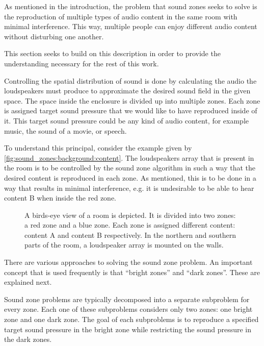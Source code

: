 As mentioned in the introduction, the problem that sound zones seeks to solve is the reproduction
of multiple types of audio content in the same room with minimal interference.
This way, multiple people can enjoy different audio content without disturbing one another.

This section seeks to build on this description in order to provide the understanding necessary 
for the rest of this work.

Controlling the spatial distribution of sound is done by calculating the audio the loudspeakers must produce to approximate 
the desired sound field in the given space.
The space inside the enclosure is divided up into multiple zones.
Each zone is assigned target sound pressure that we would like to have reproduced inside of it.
This target sound pressure could be any kind of audio content, for example music, the sound of a movie, or speech.

To understand this principal, consider the example given by \autoref{fig:sound_zones:background:content}.
The loudspeakers array that is present in the room is to be controlled by the sound zone algorithm 
in such a way that the desired content is reproduced in each zone.
As mentioned, this is to be done in a way that results in minimal interference, e.g. it is undesirable
to be able to hear content B when inside the red zone.

\begin{figure}[h]
    \centering
    \scalebox{1.0}{}
    \caption{A birds-eye view of a room is depicted.
        It is divided into two zones: a red zone and a blue zone.
        Each zone is assigned different content: content A and content B respectively.
        In the northern and southern parts of the room, a loudspeaker array is mounted on the walls.
        }
    \label{fig:sound_zones:background:content}
\end{figure}

There are various approaches to solving the sound zone problem.
An important concept that is used frequently is that ``bright zones'' and ``dark zones''.
These are explained next.

Sound zone problems are typically decomposed into a separate subproblem for every zone.
Each one of these subproblems considers only two zones: one bright zone and one dark zone.
The goal of each subproblems is to reproduce a specified target sound pressure in the bright zone while restricting the 
sound pressure in the dark zones.

